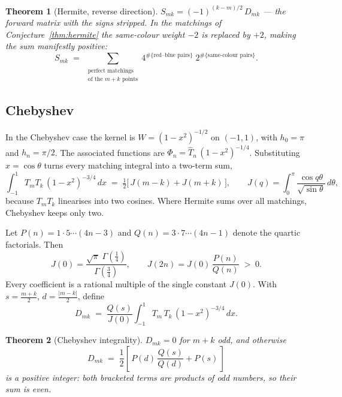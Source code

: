 \documentclass[11pt,a4paper]{article}
\newtheorem{theorem}{Theorem}[section]
\theoremstyle{definition}
\newcommand{\G}{\Gamma}
\begin{document}
\begin{tcolorbox}[colback=black!5, colframe=black!5, boxrule=0pt, sharp corners]
\begin{theorem}[Hermite, reverse direction]\label{thm:hermite-rev}
$S_{mk} = (-1)^{(k-m)/2}\, D_{mk}$ --- the forward matrix with the
signs stripped. In the matchings of Conjecture~\ref{thm:hermite} the
same-colour weight $-2$ is replaced by $+2$, making the sum
manifestly positive:
\[
  S_{mk} \;=\; \sum_{\substack{\text{perfect matchings}\\
  \text{of the } m+k \text{ points}}}
  4^{\#\{\text{red--blue pairs}\}} \; 2^{\#\{\text{same-colour pairs}\}} .
\]
\end{theorem}
\end{tcolorbox}

\subsection{Chebyshev}

In the Chebyshev case the kernel is $W = (1-x^2)^{-1/2}$ on $(-1,1)$,
with $h_0 = \pi$ and $h_n = \pi/2$. The associated functions are
$\Phi_n = \widehat T_n\, (1-x^2)^{-1/4}$. Substituting $x = \cos\theta$
turns every matching integral into a two-term sum,
\[
  \int_{-1}^{1} T_m T_k\, (1-x^2)^{-3/4}\, dx
  \;=\; \tfrac12\bigl[\, J(m-k) + J(m+k) \,\bigr],
  \qquad
  J(q) = \int_0^\pi \frac{\cos q\theta}{\sqrt{\sin\theta}}\, d\theta ,
\]
because $T_m T_k$ linearises into two cosines. Where Hermite sums over
all matchings, Chebyshev keeps only two.

Let $P(n) = 1 \cdot 5 \cdots (4n-3)$ and $Q(n) = 3 \cdot 7 \cdots
(4n-1)$ denote the quartic factorials. Then
\[
  J(0) = \frac{\sqrt\pi\; \G(\tfrac14)}{\G(\tfrac34)},
  \qquad
  J(2n) = J(0)\, \frac{P(n)}{Q(n)} \;>\; 0 .
\]
Every coefficient is a rational multiple of the single constant
$J(0)$. With $s = \tfrac{m+k}{2}$, $d = \tfrac{|m-k|}{2}$, define
\[
  D_{mk} \;=\; \frac{Q(s)}{J(0)}
  \int_{-1}^{1} T_m\, T_k\, (1-x^2)^{-3/4}\, dx .
\]

\begin{tcolorbox}[colback=black!5, colframe=black!5, boxrule=0pt, sharp corners]
\begin{theorem}[Chebyshev integrality]\label{thm:cheb-int}
$D_{mk} = 0$ for $m+k$ odd, and otherwise
\[
  D_{mk} \;=\; \frac12 \left[\, P(d)\,\frac{Q(s)}{Q(d)} + P(s) \,\right]
\]
is a \emph{positive} integer: both bracketed terms are products of odd
numbers, so their sum is even.
\end{theorem}
\end{tcolorbox}
\end{document}
